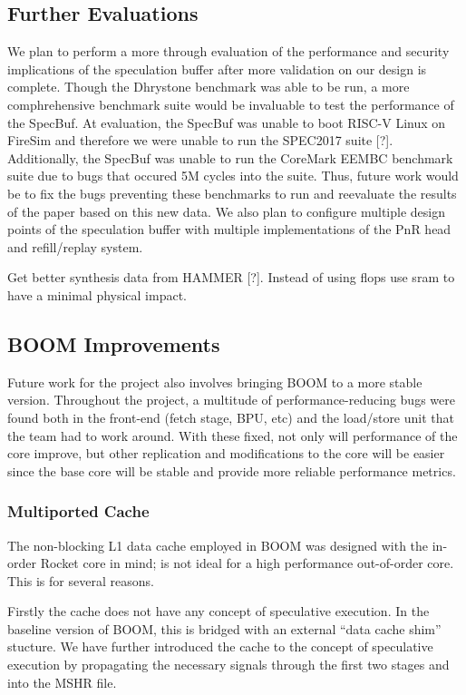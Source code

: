 \subsection{Further Evaluations}

We plan to perform a more through evaluation of the performance and security implications of the
speculation buffer after more validation on our design is complete. 
Though the Dhrystone benchmark was able to be run, a more comphrehensive benchmark suite would be invaluable to test
the performance of the SpecBuf. At evaluation, the SpecBuf was unable to boot RISC-V Linux on FireSim and therefore
we were unable to run the SPEC2017 suite [?]. Additionally, the SpecBuf was unable to run the CoreMark EEMBC benchmark
suite due to bugs that occured 5M cycles into the suite. Thus, future work would be to fix the bugs preventing these
benchmarks to run and reevaluate the results of the paper based on this new data. We also plan to configure multiple design
points of the speculation buffer with multiple implementations of the PnR head and refill/replay system.

Get better synthesis data from HAMMER [?]. Instead of using flops use sram to have a minimal 
physical impact.

\subsection{BOOM Improvements}

Future work for the project also involves bringing BOOM to a more stable version. Throughout
the project, a multitude of performance-reducing bugs were found both in the front-end (fetch stage, BPU, etc) and the 
load/store unit that the team had to work around. With these fixed, not only will performance
of the core improve, but other replication and modifications to the core will be easier since
the base core will be stable and provide more reliable performance metrics.

\subsubsection{Multiported Cache}
The non-blocking L1 data cache employed in BOOM was designed with the in-order Rocket core in mind; is not ideal for
a high performance out-of-order core. This is for several reasons.

Firstly the cache does not have any concept of speculative execution.
In the baseline version of BOOM, this is bridged with an external ``data cache shim'' stucture. We have further introduced the cache to the
concept of speculative execution by propagating the necessary signals through the first two stages and into the MSHR file.

